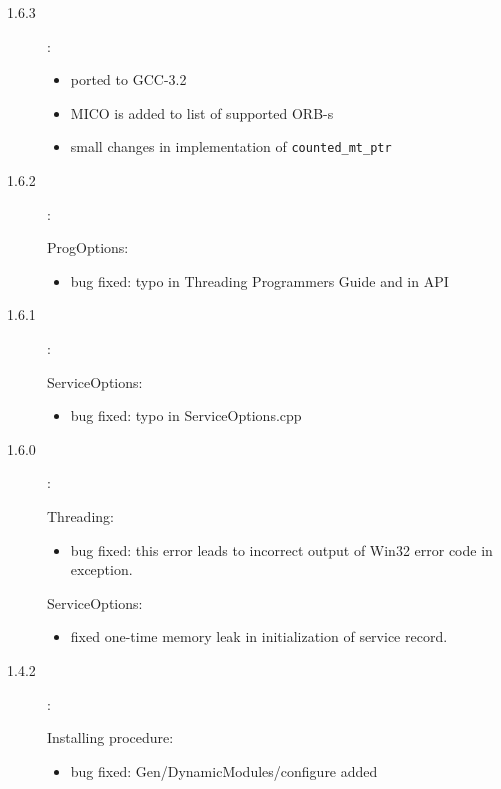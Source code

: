 \documentclass[10pt]{article}
\newenvironment{component}[1]{\par#1:\begin{itemize}}{\end{itemize}}
\begin{document}
\begin{description}
 \item [1.6.3]:
       \begin{itemize}
        \item ported to GCC-3.2
        \item MICO is added to list of supported ORB-s
        \item small changes in implementation of \verb|counted_mt_ptr| 
       \end{itemize}
 \item [1.6.2]:
       \begin{component}{ProgOptions}
       \item bug fixed: typo in Threading Programmers Guide and in API
       \end{component}
 \item [1.6.1]:
       \begin{component}{ServiceOptions}
       \item bug fixed: typo in ServiceOptions.cpp
       \end{component}

 \item [1.6.0]:
       \begin{component}{Threading}
       \item bug fixed: this error leads to incorrect output of Win32 error code in exception.
       \end{component}

       \begin{component}{ServiceOptions}
       \item fixed one-time memory leak in initialization of service record.
       \end{component}

 \item [1.4.2]:
       \begin{component}{Installing procedure}
       \item bug fixed: Gen/DynamicModules/configure added
       \end{component}


\end{description}
\end{document}
